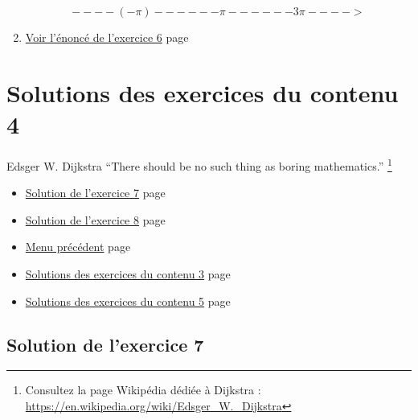 \documentclass[a4paper,11pt]{book}
\begin{document}
\begin{enumerate}
\[----(-\pi)------\pi------3\pi---->\]

\item \hyperref[org4ecd154]{Voir l'énoncé de l'exercice 6}
page~\pageref{page:sec2.3.3exo6}
\end{enumerate}


\clearpage
\chapter{Solutions des exercices du contenu 4}
\label{sec:orgfbc310b}
\label{org74bc845}
\label{page:sec8.4sols-cont4}

\begin{myquote}{Edsger W. Dijkstra}
\enquote{There should be no such thing as boring mathematics.}
\footnote{Consultez la page Wikipédia dédiée à Dijkstra : \url{https://en.wikipedia.org/wiki/Edsger_W._Dijkstra}}
\end{myquote}


\clearpage

\label{org3b486a4}
\label{page:sols-cont4-menu}
\begin{itemize}
\item \hyperref[orgad10de5]{Solution de l'exercice 7} page \pageref{page:sec8.4.1sol7}
\item \hyperref[org01182cf]{Solution de l'exercice 8} page \pageref{page:sec8.4.2sol8}
\item \hyperref[orgd150cd0]{Menu précédent} page \pageref{page:sols-contents-menu}
\item \hyperref[org76d02b6]{Solutions des exercices du contenu 3} page \pageref{page:sec8.3sols-cont3}
\item \hyperref[orge89e966]{Solutions des exercices du contenu 5} page \pageref{page:sec8.5sols-cont5}
\end{itemize}

\clearpage

\section{Solution de l'exercice 7}
\label{sec:orgd4810fa}
\label{orgad10de5}
\label{page:sec8.4.1sol7}
\end{document}
